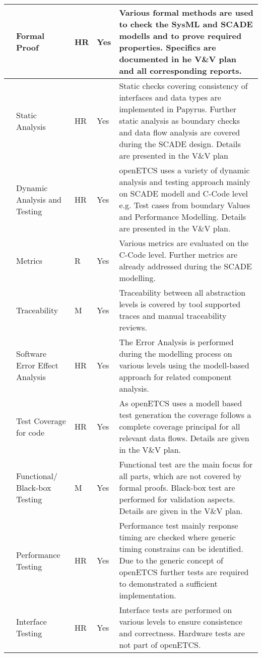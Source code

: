 \documentclass{template/openetcs_article}
\begin{document}
\begin{appendices}
\begin{center}
\begin{longtable}{|m{1cm}|m{5cm}|m{1cm}|m{2cm}|m{5cm}|}
\centering 1 &
Formal Proof &
\centering
HR &
\centering
Yes &
Various formal methods are used to check the SysML and SCADE modells and to prove required properties. Specifics are documented in he V\&V plan and all corresponding reports.\\\hline
\centering 2 &
Static Analysis &
\centering
HR &
\centering
Yes &
Static checks covering consistency of interfaces and data types are implemented in Papyrus. Further static analysis as boundary checks and data flow analysis are covered during the SCADE design. Details are presented in the V\&V plan\\\hline
\centering 3 &
Dynamic Analysis and Testing &
\centering
HR &
\centering
Yes &
openETCS uses a variety of dynamic analysis and testing approach mainly on SCADE modell and C-Code level e.g. Test cases from boundary Values and Performance Modelling. Details are presented in the V\&V plan.\\\hline
\centering 4 &
Metrics &
\centering
R &
\centering
Yes &
Various metrics are evaluated on the C-Code level. Further metrics are already addressed during the SCADE modelling. \\\hline
\centering 5 &
Traceability &
\centering
M &
\centering
Yes &
Traceability between all abstraction levels is covered by tool supported traces and manual traceability reviews.\\\hline
\centering 6 &
Software Error Effect Analysis &
\centering
HR &
\centering
Yes &
The Error Analysis is performed during the modelling process on various levels using the modell-based approach for related component analysis.\\\hline
\centering 7 &
Test Coverage for code &
\centering
HR &
\centering
Yes &
As openETCS uses a modell based test generation the coverage follows a complete coverage principal for all relevant data flows. Details are given in the V\&V plan.\\\hline
\centering 8 &
Functional/ Black-box Testing &
\centering
M &
\centering
Yes &
Functional test are the main focus for all parts, which are not covered by formal proofs. Black-box test are performed for validation aspects. Details are given in the V\&V plan.\\\hline
\centering 9 &
Performance Testing &
\centering
HR &
\centering
Yes &
Performance test mainly response timing are checked where generic timing constrains can be identified. Due to the generic concept of openETCS further tests are required to demonstrated a sufficient implementation.\\\hline
\centering 10 &
Interface Testing &
\centering
HR &
\centering
Yes &
Interface tests are performed on various levels to ensure consistence and correctness. Hardware tests are not part of openETCS.\\\hline
\end{longtable}
\end{center}


\end{appendices}
\end{document}
